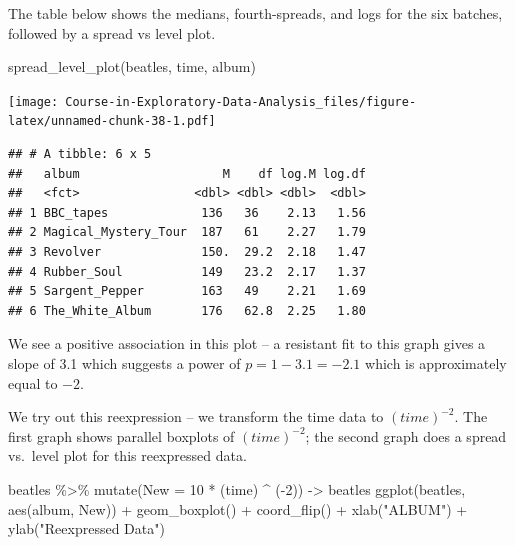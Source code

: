 \documentclass[
]{book}
\newenvironment{Shaded}{\begin{snugshade}}{\end{snugshade}}
\newcommand{\AttributeTok}[1]{\textcolor[rgb]{0.77,0.63,0.00}{#1}}
\newcommand{\DecValTok}[1]{\textcolor[rgb]{0.00,0.00,0.81}{#1}}
\newcommand{\FunctionTok}[1]{\textcolor[rgb]{0.00,0.00,0.00}{#1}}
\newcommand{\NormalTok}[1]{#1}
\newcommand{\OtherTok}[1]{\textcolor[rgb]{0.56,0.35,0.01}{#1}}
\newcommand{\SpecialCharTok}[1]{\textcolor[rgb]{0.00,0.00,0.00}{#1}}
\newcommand{\StringTok}[1]{\textcolor[rgb]{0.31,0.60,0.02}{#1}}
\begin{document}
The table below shows the medians, fourth-spreads, and logs for the six batches, followed by a spread vs level plot.

\begin{Shaded}
\begin{Highlighting}[]
\FunctionTok{spread\_level\_plot}\NormalTok{(beatles, time, album)}
\end{Highlighting}
\end{Shaded}

\texttt{[image: Course-in-Exploratory-Data-Analysis\_files/figure-latex/unnamed-chunk-38-1.pdf]}

\begin{verbatim}
## # A tibble: 6 x 5
##   album                    M    df log.M log.df
##   <fct>                <dbl> <dbl> <dbl>  <dbl>
## 1 BBC_tapes             136   36    2.13   1.56
## 2 Magical_Mystery_Tour  187   61    2.27   1.79
## 3 Revolver              150.  29.2  2.18   1.47
## 4 Rubber_Soul           149   23.2  2.17   1.37
## 5 Sargent_Pepper        163   49    2.21   1.69
## 6 The_White_Album       176   62.8  2.25   1.80
\end{verbatim}

We see a positive association in this plot -- a resistant fit to this graph gives a slope of 3.1 which suggests a power of \(p = 1 - 3.1 = -2.1\) which is approximately equal to \(-2\).

We try out this reexpression -- we transform the time data to \((time)^{-2}\). The first graph shows parallel boxplots of \((time)^{-2}\); the second graph does a spread vs.~level plot for this reexpressed data.

\begin{Shaded}
\begin{Highlighting}[]
\NormalTok{beatles }\SpecialCharTok{\%\textgreater{}\%} 
  \FunctionTok{mutate}\NormalTok{(}\AttributeTok{New =} \DecValTok{10} \SpecialCharTok{*}\NormalTok{ (time) }\SpecialCharTok{\^{}}\NormalTok{ (}\SpecialCharTok{{-}}\DecValTok{2}\NormalTok{)) }\OtherTok{{-}\textgreater{}}
\NormalTok{  beatles}
\FunctionTok{ggplot}\NormalTok{(beatles, }\FunctionTok{aes}\NormalTok{(album, New)) }\SpecialCharTok{+}
  \FunctionTok{geom\_boxplot}\NormalTok{() }\SpecialCharTok{+}
  \FunctionTok{coord\_flip}\NormalTok{() }\SpecialCharTok{+} \FunctionTok{xlab}\NormalTok{(}\StringTok{"ALBUM"}\NormalTok{) }\SpecialCharTok{+}
  \FunctionTok{ylab}\NormalTok{(}\StringTok{"Reexpressed Data"}\NormalTok{)}
\end{Highlighting}
\end{Shaded}
\end{document}

